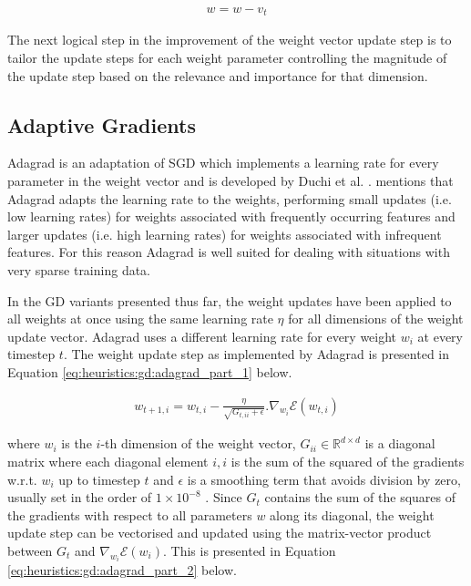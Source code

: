 \begin{equation}
      \label{eq:heuristics:gd:nag_part_2}
      \begin{split}
            w = w - v_{t}
      \end{split}
\end{equation}

The next logical step in the improvement of the weight vector update step is to tailor the update steps for each weight parameter controlling the magnitude of the update step based on the relevance and importance for that dimension.

\subsection{Adaptive Gradients}
\label{sec:heuristics:adagrad}

\Acl{Adagrad} is an adaptation of \ac{SGD} which implements a learning rate for every parameter in the weight vector and is developed by Duchi et al. \cite{ref:duchi:2011}. \citeauthor{ref:ruder:2016} \cite{ref:ruder:2016} mentions that \Ac{Adagrad} adapts the learning rate to the weights, performing small updates (i.e. low learning rates) for weights associated with frequently occurring features and larger updates (i.e. high learning rates) for weights associated with infrequent features. For this reason \ac{Adagrad} is well suited for dealing with situations with very sparse training data.

In the \ac{GD} variants presented thus far, the weight updates have been applied to all weights at once using the same learning rate $\eta$ for all dimensions of the weight update vector. \Ac{Adagrad} uses a different learning rate for every weight $w_{i}$ at every timestep $t$. The weight update step as implemented by \ac{Adagrad} is presented in Equation \ref{eq:heuristics:gd:adagrad_part_1} below.

\begin{equation}
      \label{eq:heuristics:gd:adagrad_part_1}
      \begin{split}
            w_{t+1,i} = w_{t,i} - \frac{\eta}{\sqrt{G_{t,ii} + \epsilon}}.\nabla_{w_{i}}\mathcal{E}(w_{t,i})
      \end{split}
\end{equation}

where $w_{i}$ is the $i$-th dimension of the weight vector, $G_{ii} \in \mathbb{R}^{d \times d}$ is a diagonal matrix where each diagonal element $i,i$ is the sum of the squared of the gradients w.r.t. $w_{i}$ up to timestep $t$ and $\epsilon$ is a smoothing term that avoids division by zero, usually set in the order of $1 \times 10^{-8}$ \cite{ref:ruder:2016}. Since $G_{t}$ contains the sum of the squares of the gradients with respect to all parameters $w$ along its diagonal, the weight update step can be vectorised and updated using the matrix-vector product between $G_{t}$ and $\nabla_{w_{i}}\mathcal{E}(w_{i})$. This is presented in Equation \ref{eq:heuristics:gd:adagrad_part_2} below.

